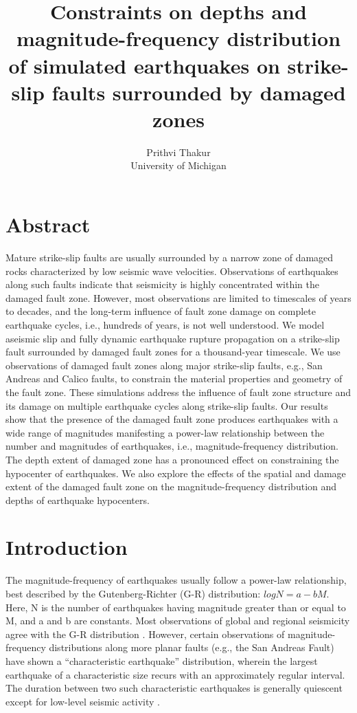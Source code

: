 \documentclass[11pt]{article}
\begin{document}
\title{\textbf{Constraints on depths and magnitude-frequency distribution of simulated earthquakes on strike-slip faults surrounded by damaged zones}}
\author{Prithvi Thakur\\University of Michigan}

\maketitle

\doublespacing
\section*{Abstract}
Mature strike-slip faults are usually surrounded by a narrow zone of damaged rocks characterized by low seismic wave velocities. Observations of earthquakes along such faults indicate that seismicity is highly concentrated within the damaged fault zone. However, most observations are limited to timescales of years to decades, and the long-term influence of fault zone damage on complete earthquake cycles, i.e., hundreds of years, is not well understood. We model aseismic slip and fully dynamic earthquake rupture propagation on a strike-slip fault surrounded by damaged fault zones for a thousand-year timescale. We use observations of damaged fault zones along major strike-slip faults, e.g., San Andreas and Calico faults, to constrain the material properties and geometry of the fault zone. These simulations address the influence of fault zone structure and its damage on multiple earthquake cycles along strike-slip faults. Our results show that the presence of the damaged fault zone produces earthquakes with a wide range of magnitudes manifesting a power-law relationship between the number and magnitudes of earthquakes, i.e., magnitude-frequency distribution. The depth extent of damaged zone has a pronounced effect on constraining the hypocenter of earthquakes. We also explore the effects of the spatial and damage extent of the damaged fault zone on the magnitude-frequency distribution and depths of earthquake hypocenters.

\section{Introduction}
The magnitude-frequency of earthquakes usually follow a power-law relationship, best described by the Gutenberg-Richter (G-R) distribution: $logN = a - bM$. Here, N is the number of earthquakes having magnitude greater than or equal to M, and a and b are constants. Most observations of global and regional seismicity agree with the G-R distribution \citep{page_felzer_2015, rundle_1989}. However, certain observations of magnitude-frequency distributions along more planar faults (e.g., the San Andreas Fault) have shown a “characteristic earthquake” distribution, wherein the largest earthquake of a characteristic size recurs with an approximately regular interval. The duration between two such characteristic earthquakes is generally quiescent except for low-level seismic activity \citep{schwartz_coppersmith_1984, wesnousky_1994}. 
\end{document}
